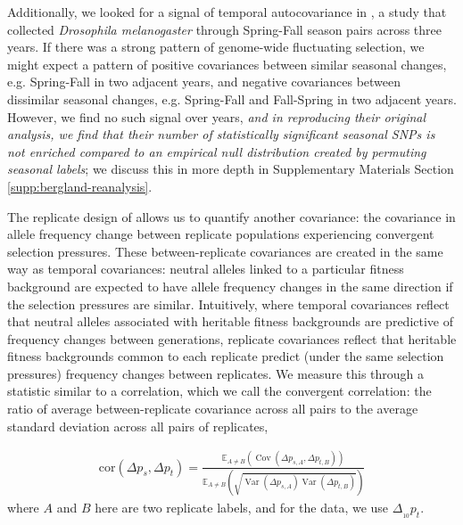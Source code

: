 \documentclass[11pt]{article}
\newcommand{\vb}[1]{{\it \color{blue} #1}}
\newcommand{\E}{\mathbb{E}}
\DeclareMathOperator{\var}{Var}
\DeclareMathOperator{\cov}{Cov}
\begin{document}
Additionally, we looked for a signal of temporal autocovariance in
\textcite{Bergland2014-ij}, a study that collected \emph{Drosophila
melanogaster} through Spring-Fall season pairs across three years. If there was
a strong  pattern of genome-wide fluctuating selection, we might expect a
pattern of positive covariances between similar seasonal changes, e.g.
Spring-Fall in two adjacent years, and negative covariances between dissimilar
seasonal changes, e.g. Spring-Fall and Fall-Spring in two adjacent years.
However, we find no such signal over years, \vb{and in reproducing their
  original analysis, we find that their number of statistically significant
  seasonal SNPs is not enriched compared to an empirical null distribution
  created by permuting seasonal labels}; we discuss this in more depth in
  Supplementary Materials Section \ref{supp:bergland-reanalysis}.

The replicate design of \textcite{Barghi2019-qy} allows us to quantify another
covariance: the covariance in allele frequency change between replicate
populations experiencing convergent selection pressures. These
between-replicate covariances are created in the same way as temporal
covariances: neutral alleles linked to a particular fitness background are
expected to have allele frequency changes in the same direction if the
selection pressures are similar. Intuitively, where temporal covariances
reflect that neutral alleles associated with heritable fitness backgrounds are
predictive of frequency changes between generations, replicate covariances
reflect that heritable fitness backgrounds common to each replicate predict
(under the same selection pressures) frequency changes between replicates. We
measure this through a statistic similar to a correlation, which we call the
convergent correlation: the ratio of average between-replicate covariance
across all pairs to the average standard deviation across all pairs of
replicates, 


\begin{align}
  \label{eq:conv-corr}
  \mathrm{cor}(\Delta p_s, \Delta p_t) = \frac{\E_{A\ne B} \left( \cov(\Delta p_{s,A}, \Delta p_{t,B}) \right)}{\E_{A\ne B} \left( \sqrt{\var(\Delta p_{s,A}) \var(\Delta p_{t,B})} \right)}
\end{align}
%
where $A$ and $B$ here are two replicate labels, and for the
\textcite{Barghi2019-qy} data, we use $\Delta_{_{10}} p_t$.
\end{document}
